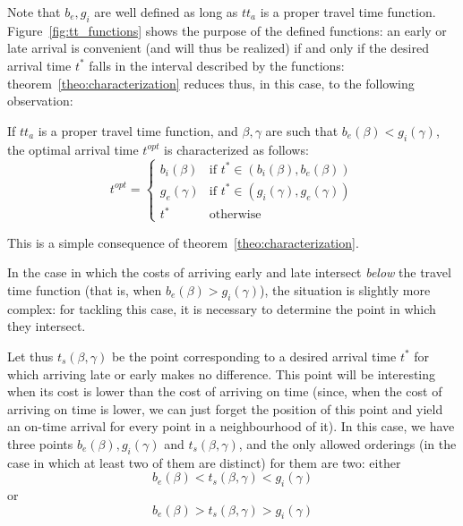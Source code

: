 Note that \(b_e, g_i\) are well defined as long as \(tt_a\) is a proper travel time function.
Figure~\ref{fig:tt_functions} shows the purpose of the defined functions:
an early or late arrival is convenient (and will thus be realized) if and only if the desired arrival time \(t^*\) falls in the interval described by the functions:
theorem~\ref{theo:characterization} reduces thus, in this case, to the following observation:
\begin{obs}
  \label{obs:char_opt_time_simple}
  If \(tt_a\) is a proper travel time function, and \(\beta, \gamma\) are such that \(b_e(\beta) < g_i(\gamma)\), the optimal arrival time \(t^{opt}\) is characterized as follows:
  \begin{equation}
    \label{eq:char_opt_time_simple}
    t^{opt} =
    \begin{cases}
      b_i(\beta) & \text{if } t^*\in(b_i(\beta), b_e(\beta)) \\
      g_e(\gamma) & \text{if } t^*\in(g_i(\gamma), g_e(\gamma)) \\
      t^* & \text{otherwise}
    \end{cases}
  \end{equation}
\end{obs}

This is a simple consequence of theorem~\ref{theo:characterization}.

In the case in which the costs of arriving early and late intersect \textit{below} the travel time function
(that is, when \(b_e(\beta) > g_i(\gamma)\)),
the situation is slightly more complex:
for tackling this case, it is necessary to determine the point in which they intersect.

Let thus \(t_s(\beta, \gamma)\) be the point corresponding to a desired arrival time \(t^*\) for which arriving late or early makes no difference.
This point will be interesting when its cost is lower than the cost of arriving on time (since, when the cost of arriving on time is lower,
we can just forget the position of this point and yield an on-time arrival for every point in a \label{eq:char_opt_time_comp}
neighbourhood of it).
In this case, we have three points \(b_e(\beta), g_i(\gamma)\) and \(t_s(\beta, \gamma)\),
and the only allowed orderings (in the case in which at least two of them are distinct) for them are two:
either
\begin{equation}\label{eq:simple_ordering}
  b_e(\beta) < t_s(\beta, \gamma) < g_i(\gamma)
\end{equation}
or
\begin{equation}\label{eq:complex_ordering}
  b_e(\beta) > t_s(\beta, \gamma) > g_i(\gamma)
\end{equation}

